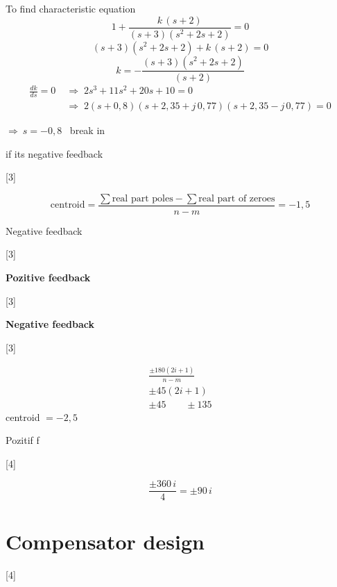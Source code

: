 \documentclass[11pt,a4paper]{article}
\begin{document}
\medskip
\noindent To find characteristic equation
\[
1 + \frac{k\,(s+2)}{(s+3)(s^2+2s+2)} = 0
\]
\[
(s+3)(s^2+2s+2) + k\,(s+2) = 0
\]
\[
k = -\frac{(s+3)(s^2+2s+2)}{(s+2)}
\]
\begin{align*}
\frac{dk}{ds} = 0 &\;\Rightarrow\; 2s^3+11s^2+20s+10 = 0\\
&\;\Rightarrow\; 2(s+0{,}8)(s+2{,}35+j\,0{,}77)(s+2{,}35-j\,0{,}77) = 0
\end{align*}

\noindent $\Rightarrow\ s=-0{,}8$ \ break in

\medskip
\noindent if its negative feedback

[3]

\[
\text{centroid} = \frac{\sum \text{real part poles} - \sum \text{real part of zeroes}}{n-m} = -1{,}5
\]

\begin{ornek}
Negative feedback
\end{ornek}

[3]

\noindent\textbf{Pozitive feedback}

[3]

\noindent\textbf{Negative feedback}

[3]

\begin{gather*}
\frac{\pm 180(2i+1)}{n-m}\\
\pm 45(2i+1)\\
\pm 45 \qquad \pm 135
\end{gather*}
centroid $=-2{,}5$

\noindent Pozitif f\okunamadi{}

[4]

\[
\frac{\pm 360\,i}{4} = \pm 90\,i
\]

\section{Compensator design}

[4]
\end{document}
